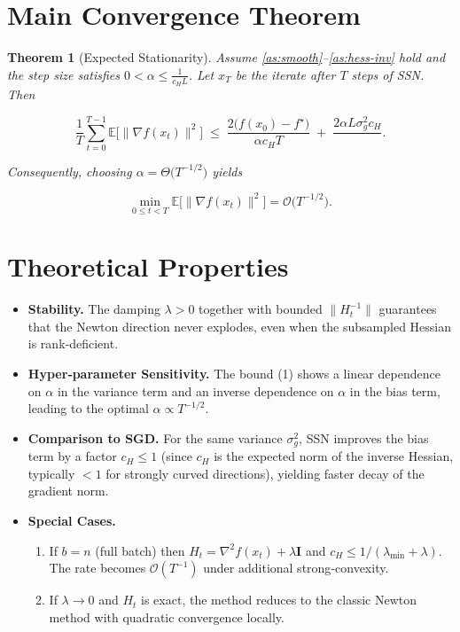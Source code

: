 \documentclass{article}
\newtheorem{theorem}{Theorem}
\newcommand{\E}{\mathbb{E}}
\newcommand{\Id}{\mathbf I}
\begin{document}
\section*{Main Convergence Theorem}
\begin{theorem}[Expected Stationarity]\label{thm:main}
Assume \ref{as:smooth}–\ref{as:hess-inv} hold and the step size satisfies $0<\alpha\le \frac{1}{c_H L}$.  
Let $x_T$ be the iterate after $T$ steps of SSN. Then  

\[
\frac1T\sum_{t=0}^{T-1}\E\big[\|\nabla f(x_t)\|^2\big]
\;\le\;
\frac{2\big(f(x_0)-f^\star\big)}{\alpha c_H T}
\;+\;
\frac{2\alpha L\sigma_g^2 c_H}{\; }.
\tag{1}
\]

Consequently, choosing $\alpha=\Theta\!\big(T^{-1/2}\big)$ yields  

\[
\min_{0\le t<T}\E\big[\|\nabla f(x_t)\|^2\big]=\mathcal{O}\!\big(T^{-1/2}\big).
\]
\end{theorem}

\section*{Theoretical Properties}
\begin{itemize}
\item \textbf{Stability.} The damping $\lambda>0$ together with bounded $\|H_t^{-1}\|$ guarantees that the Newton direction never explodes, even when the subsampled Hessian is rank‑deficient.
\item \textbf{Hyper‑parameter Sensitivity.} The bound (1) shows a linear dependence on $\alpha$ in the variance term and an inverse dependence on $\alpha$ in the bias term, leading to the optimal $\alpha\propto T^{-1/2}$.
\item \textbf{Comparison to SGD.} For the same variance $\sigma_g^2$, SSN improves the bias term by a factor $c_H\le 1$ (since $c_H$ is the expected norm of the inverse Hessian, typically $<1$ for strongly curved directions), yielding faster decay of the gradient norm.
\item \textbf{Special Cases.}
    \begin{enumerate}
        \item If $b=n$ (full batch) then $H_t=\nabla^2 f(x_t)+\lambda\Id$ and $c_H\le 1/(\lambda_{\min}+\lambda)$. The rate becomes $\mathcal{O}(T^{-1})$ under additional strong‑convexity.
        \item If $\lambda\to0$ and $H_t$ is exact, the method reduces to the classic Newton method with quadratic convergence locally.
    \end{enumerate}
\end{itemize}
\end{document}
